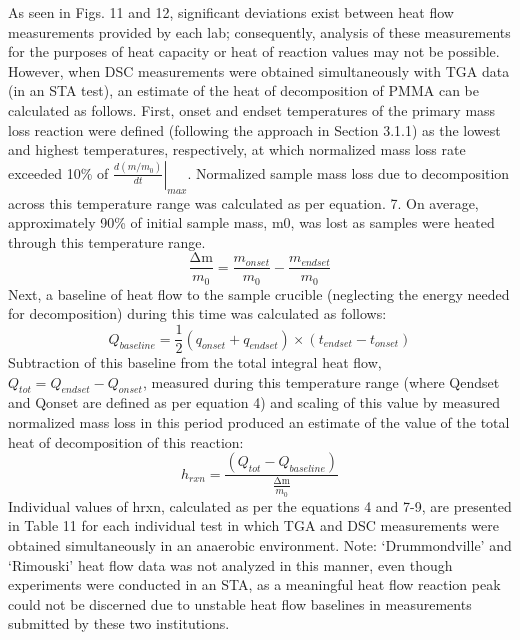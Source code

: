 \documentclass{book}
\begin{document}
As seen in Figs. 11 and 12, significant deviations exist between heat flow measurements provided by each lab; consequently, analysis of these measurements for the purposes of heat capacity or heat of reaction values may not be possible. However, when DSC measurements were obtained simultaneously with TGA data (in an STA test), an estimate of the heat of decomposition of PMMA can be calculated as follows. First, onset and endset temperatures of the primary mass loss reaction were defined (following the approach in Section 3.1.1) as the lowest and highest temperatures, respectively, at which normalized mass loss rate exceeded 10\% of $\left.\frac{d\left(m/m_0\right)}{dt}\right|_{max}$. Normalized sample mass loss due to decomposition across this temperature range was calculated as per equation. 7. On average, approximately 90\% of initial sample mass, m0, was lost as samples were heated through this temperature range.
\begin{equation}
\frac{\mathrm{\Delta m}}{m_0}=\frac{m_{onset}}{m_0}-\frac{m_{endset}}{m_0}
\end{equation}
Next, a baseline of heat flow to the sample crucible (neglecting the energy needed for decomposition) during this time was calculated as follows:
\begin{equation}
   Q_{baseline}=\frac{1}{2}\left(q_{onset}+q_{endset}\right)\times\left(t_{endset}-t_{onset}\right)
\end{equation}
Subtraction of this baseline from the total integral heat flow, $Q_{tot}=Q_{endset}-Q_{onset}$, measured during this temperature range (where Qendset and Qonset are defined as per equation 4) and scaling of this value by measured normalized mass loss in this period produced an estimate of the value of the total heat of decomposition of this reaction:
\begin{equation}
h_{rxn}=\frac{\left(Q_{tot}-Q_{baseline}\right)}{\frac{\mathrm{\Delta m}}{m_0}}
\end{equation}
Individual values of hrxn, calculated as per the equations 4 and 7-9, are presented in Table 11 for each individual test in which TGA and DSC measurements were obtained simultaneously in an anaerobic environment. Note: ‘Drummondville’ and ‘Rimouski’ heat flow data was not analyzed in this manner, even though experiments were conducted in an STA, as a meaningful heat flow reaction peak could not be discerned due to unstable heat flow baselines in measurements submitted by these two institutions.
\end{document}
